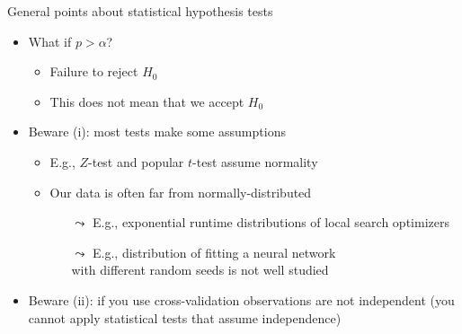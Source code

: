 \begin{frame}[c]{General points about statistical hypothesis tests}

\begin{itemize}
\item What if $p > \alpha$?
\begin{itemize}
\item \alert{Failure to reject $H_0$}
\item \alert{This does not mean that we accept $H_0$}
\end{itemize}


\pause
\bigskip
\item Beware (i): most tests make some assumptions
\begin{itemize}
\item E.g., $Z$-test and popular $t$-test assume \alert{normality}
\item Our data is often far from normally-distributed
\begin{itemize}
\item[$\leadsto$] E.g., exponential runtime distributions of local search optimizers
\item[$\leadsto$] E.g., distribution of fitting a neural network\\ with different random seeds is not well studied
\end{itemize}
\end{itemize}
\medskip
\pause
\item Beware (ii): if you use cross-validation observations are not independent (you cannot apply statistical tests that assume independence)
\end{itemize}

\end{frame}
